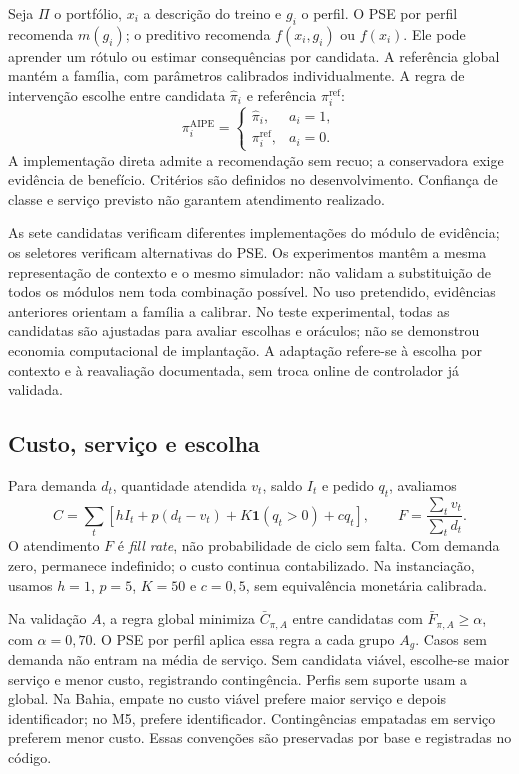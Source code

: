 \documentclass[preprint,12pt]{elsarticle}
\begin{document}
Seja $\Pi$ o portfólio, $x_i$ a descrição do treino e $g_i$ o perfil. O PSE por perfil recomenda $m(g_i)$; o preditivo recomenda $f(x_i,g_i)$ ou $f(x_i)$. Ele pode aprender um rótulo ou estimar consequências por candidata. A referência global mantém a família, com parâmetros calibrados individualmente. A regra de intervenção escolhe entre candidata $\widehat\pi_i$ e referência $\pi_i^{\mathrm{ref}}$:
\[
 \pi_i^{\mathrm{AIPE}}=
 \begin{cases}\widehat\pi_i,&a_i=1,\\\pi_i^{\mathrm{ref}},&a_i=0.\end{cases}
\]
A implementação direta admite a recomendação sem recuo; a conservadora exige evidência de benefício. Critérios são definidos no desenvolvimento. Confiança de classe e serviço previsto não garantem atendimento realizado.

As sete candidatas verificam diferentes implementações do módulo de evidência; os seletores verificam alternativas do PSE. Os experimentos mantêm a mesma representação de contexto e o mesmo simulador: não validam a substituição de todos os módulos nem toda combinação possível. No uso pretendido, evidências anteriores orientam a família a calibrar. No teste experimental, todas as candidatas são ajustadas para avaliar escolhas e oráculos; não se demonstrou economia computacional de implantação. A adaptação refere-se à escolha por contexto e à reavaliação documentada, sem troca online de controlador já validada.

\subsection{Custo, serviço e escolha}
Para demanda $d_t$, quantidade atendida $v_t$, saldo $I_t$ e pedido $q_t$, avaliamos
\begin{equation}
 C=\sum_t[hI_t+p(d_t-v_t)+K\mathbf1(q_t>0)+cq_t],
 \qquad F=\frac{\sum_t v_t}{\sum_t d_t}.
 \label{eq:metrics}
\end{equation}
O atendimento $F$ é \textit{fill rate}, não probabilidade de ciclo sem falta. Com demanda zero, permanece indefinido; o custo continua contabilizado. Na instanciação, usamos $h=1$, $p=5$, $K=50$ e $c=0{,}5$, sem equivalência monetária calibrada.

Na validação $A$, a regra global minimiza $\bar C_{\pi,A}$ entre candidatas com $\bar F_{\pi,A}\geq\alpha$, com $\alpha=0{,}70$. O PSE por perfil aplica essa regra a cada grupo $A_g$. Casos sem demanda não entram na média de serviço. Sem candidata viável, escolhe-se maior serviço e menor custo, registrando contingência. Perfis sem suporte usam a global. Na Bahia, empate no custo viável prefere maior serviço e depois identificador; no M5, prefere identificador. Contingências empatadas em serviço preferem menor custo. Essas convenções são preservadas por base e registradas no código.
\end{document}
